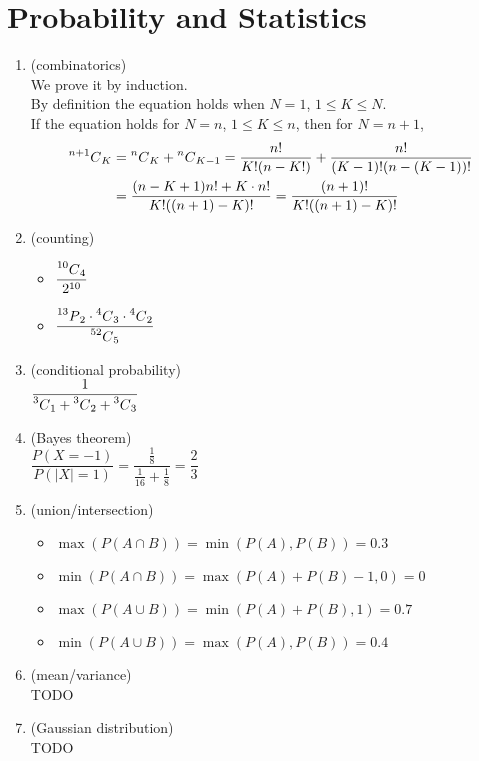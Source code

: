 \newcommand{\mlComb}[2]{\prescript{#1}{}{C}_{#2}}
\newcommand{\mlPerm}[2]{\prescript{#1}{}{P}_{#2}}

\section{Probability and Statistics}
\begin{enumerate}[(1)]
	\item (combinatorics) \\
		We prove it by induction. \\
		By definition the equation holds when $N=1$, $1\leq K \leq N$. \\
		If the equation holds for $N = n$, $1 \leq K \leq n$, then for $N = n+1$, \\
		\begin{align*}
			\mlComb{n+1}{K} &= \mlComb{n}{K} + \mlComb{n}{K-1} = \frac{n!}{K!(n-K!)} + \frac{n!}{(K-1)!(n-(K-1))!} \\
					&= \frac{(n-K+1)n! + K\cdot n!}{K!((n+1)-K)!} = \frac{(n+1)!}{K!((n+1)-K)!}
		\end{align*}
	\item (counting)
	\begin{itemize}
		\item $\dfrac{\mlComb{10}{4}}{2^{10}}$
		\item $\dfrac{\mlPerm{13}{2}\cdot \mlComb{4}{3}\cdot \mlComb{4}{2}}{\mlComb{52}{5}}$
	\end{itemize}
	\item (conditional probability) \\
		$\dfrac{1}{\mlComb{3}{1} + \mlComb{3}{2} + \mlComb{3}{3}}$
	\item (Bayes theorem) \\
		$\dfrac{P(X=-1)}{P(|X|=1)} = \dfrac{\frac{1}{8}}{\frac{1}{16} + \frac{1}{8}} = \dfrac{2}{3}$
	\item (union/intersection)
	\begin{itemize}
		\item $\max(P(A\cap B)) = \min(P(A), P(B)) = 0.3$
		\item $\min(P(A\cap B)) = \max(P(A) + P(B) - 1, 0) = 0$
		\item $\max(P(A\cup B)) = \min(P(A) + P(B), 1) = 0.7$
		\item $\min(P(A\cup B)) = \max(P(A), P(B)) = 0.4$
	\end{itemize}
	\item (mean/variance) \\
		TODO
	\item (Gaussian distribution) \\
		TODO
\end{enumerate}
